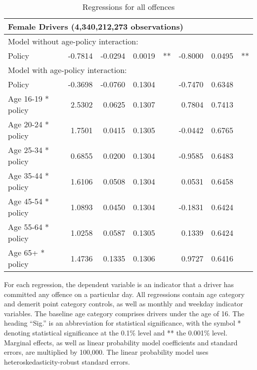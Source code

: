 \begin{table}
\begin{tabular}{l r r r l r r l}
\hline 

\multicolumn{7}{l}{\textbf{Female Drivers} (4,340,212,273 observations)} \\ 

\hline
\multicolumn{7}{l}{Model without age-policy interaction: } \\ 
Policy                   &  -0.7814       &  -0.0294        &  0.0019       &   **       &  -0.8000        &  0.0495       &   **       \\ 
\hline
\multicolumn{7}{l}{Model with age-policy interaction: } \\ 
Policy                   &  -0.3698       &  -0.0760        &  0.1304       &            &  -0.7470        &  0.6348       &            \\ 
Age 16-19 * policy   &  2.5302       &  0.0625        &  0.1307       &            &  0.7804        &  0.7413       &            \\ 
Age 20-24 * policy   &  1.7501       &  0.0415        &  0.1305       &            &  -0.0442        &  0.6765       &            \\ 
Age 25-34 * policy   &  0.6855       &  0.0200        &  0.1304       &            &  -0.9585        &  0.6483       &            \\ 
Age 35-44 * policy   &  1.6106       &  0.0508        &  0.1304       &            &  0.0531        &  0.6458       &            \\ 
Age 45-54 * policy   &  1.0893       &  0.0450        &  0.1304       &            &  -0.1831        &  0.6424       &            \\ 
Age 55-64 * policy   &  1.0258       &  0.0587        &  0.1305       &            &  0.1339        &  0.6424       &            \\ 
Age 65+ * policy   &  1.4736       &  0.1335        &  0.1306       &            &  0.9727        &  0.6416       &            \\ 

\hline 

\end{tabular} 
\caption{Regressions for all offences} 
For each regression, the dependent variable is an indicator that a driver has committed  
any offence on a particular day.  
All regressions contain age category and demerit point category controls, 
as well as monthly and weekday indicator variables. 
The baseline age category comprises drivers under the age of 16. 
The heading ``Sig.'' is an abbreviation for statistical significance, with 
the symbol * denoting statistical significance at the 0.1\% level 
and ** the 0.001\% level. 
% 
Marginal effects, as well as linear probability model coefficients and standard errors, are multiplied by 100,000. 
The linear probability model uses heteroskedasticity-robust standard errors. 
% 
\label{tab:seas_Logit_vs_LPMx100K_regs} 
\end{table} 
 

